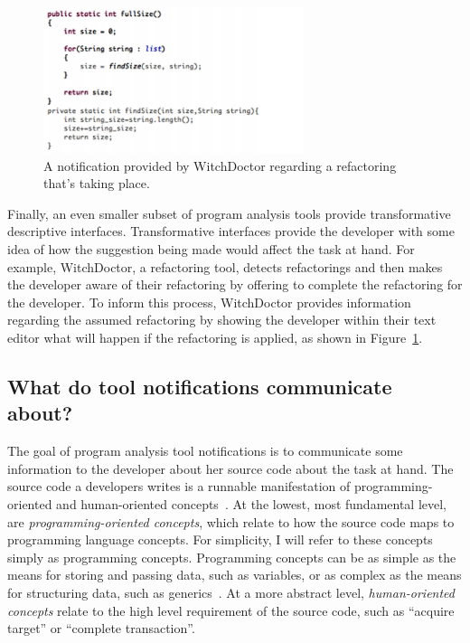 \documentclass{llncs}
\begin{document}
\begin{figure}
	\centering
	\includegraphics[width=3in]{figs/witchdoctor.png}
	\caption{A notification provided by WitchDoctor regarding a refactoring that's taking place.}
	\label{fig:witch}
\end{figure}

Finally, an even smaller subset of program analysis tools provide transformative descriptive interfaces. Transformative interfaces provide the developer with some idea of how the suggestion being made would affect the task at hand. For example, WitchDoctor, a refactoring tool, detects refactorings and then makes the developer aware of their refactoring by offering to complete the refactoring for the developer. To inform this process, WitchDoctor provides information regarding the assumed refactoring by showing the developer within their text editor what will happen if the refactoring is applied, as shown in Figure~\ref{fig:witch}.



\subsection{What do tool notifications communicate about?}

The goal of program analysis tool notifications is to communicate some information to the developer about her source code about the task at hand.
The source code a developers writes is a runnable manifestation of programming-oriented and human-oriented concepts~\cite{van2004concepts,biggerstaff1994program}. 
At the lowest, most fundamental level, are \emph{programming-oriented concepts}, which relate to how the source code maps to programming language concepts. For simplicity, I will refer to these concepts simply as programming concepts.
Programming concepts can be as simple as the means for storing and passing data, such as variables, or as complex as the means for structuring data, such as generics~\cite{jazayeri1997programming}.
At a more abstract level, \emph{human-oriented concepts} relate to the high level requirement of the source code, such as ``acquire target'' or ``complete transaction''.
\end{document}
